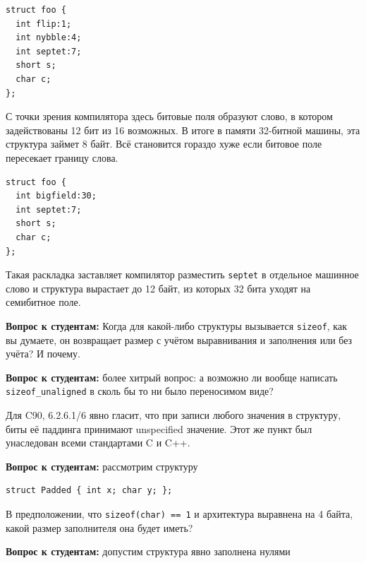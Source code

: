 \documentclass[a4paper,12pt,oneside]{book}
\newif\ifanswers
\begin{document}
\begin{lstlisting}
struct foo {
  int flip:1;
  int nybble:4;
  int septet:7;
  short s;
  char c;
};
\end{lstlisting}

С точки зрения компилятора здесь битовые поля образуют слово, в котором задействованы 12 бит из 16 возможных. В итоге в памяти 32-битной машины, эта структура займет 8 байт. Всё становится гораздо хуже если битовое поле пересекает границу слова.

\begin{lstlisting}
struct foo {
  int bigfield:30;
  int septet:7;
  short s;
  char c;
};
\end{lstlisting}

Такая раскладка заставляет компилятор разместить \lstinline!septet! в отдельное машинное слово и структура вырастает до 12 байт, из которых 32 бита уходят на семибитное поле.

\textbf{Вопрос к студентам:} Когда для какой-либо структуры вызывается \lstinline!sizeof!, как вы думаете, он возвращает размер с учётом выравнивания и заполнения или без учёта? И почему.

\ifanswers
Правильный ответ: с учётом. Потому что иначе например не работала бы идиома \lstinline!malloc(sizeof(widget))! -- здесь выделялось бы динамической памяти меньше, чем реально нужно.
\fi

\textbf{Вопрос к студентам:} более хитрый вопрос: а возможно ли вообще написать \lstinline!sizeof_unaligned! в сколь бы то ни было переносимом виде?

\ifanswers
Правильный ответ автору неизвестен. Скорее всего нет, но никто не исключает наличие какого-нибудь особо хитрого трюка.
\fi

Для C90, 6.2.6.1/6 явно гласит, что при записи любого значения в структуру, биты её паддинга принимают unspecified значение. Этот же пункт был унаследован всеми стандартами C и C++.

\textbf{Вопрос к студентам:} рассмотрим структуру

\begin{lstlisting}
struct Padded { int x; char y; };
\end{lstlisting}

В предположении, что \lstinline!sizeof(char) == 1! и архитектура выравнена на 4 байта, какой размер заполнителя она будет иметь?

\ifanswers
Правильный ответ: 3 байта.
\fi

\textbf{Вопрос к студентам:} допустим структура явно заполнена нулями
\end{document}

